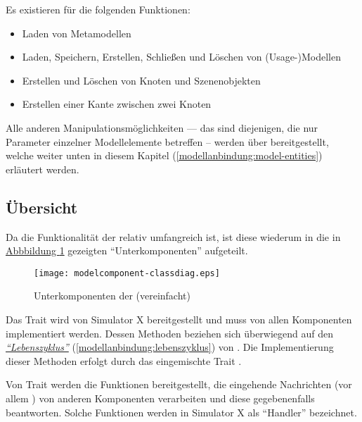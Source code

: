 \documentclass[a4paper,10pt]{sphinxmanual}
\begin{document}
Es existieren  für die folgenden Funktionen:
\begin{itemize}
\item {} 
Laden von Metamodellen

\item {} 
Laden, Speichern, Erstellen, Schließen und Löschen von (Usage-)Modellen

\item {} 
Erstellen und Löschen von Knoten und Szenenobjekten

\item {} 
Erstellen einer Kante zwischen zwei Knoten

\end{itemize}

Alle anderen Manipulationsmöglichkeiten — das sind diejenigen, die nur Parameter einzelner Modellelemente betreffen – werden über  bereitgestellt, welche weiter unten in diesem Kapitel {\hyperref[modellanbindung:model-entities]{\emph{}}} (\autoref*{modellanbindung:model-entities}) erläutert werden.


\subsection{Übersicht}
\label{modellanbindung:ubersicht}
Da die Funktionalität der  relativ umfangreich ist, ist diese wiederum in die in  \hyperref[modellanbindung:modelcomponent-classdiag]{Abbbildung  \ref*{modellanbindung:modelcomponent-classdiag}} gezeigten "`Unterkomponenten"' aufgeteilt.
\begin{figure}[htbp]
\centering
\capstart

\texttt{[image: modelcomponent-classdiag.eps]}
\caption{Unterkomponenten der  (vereinfacht)}\label{modellanbindung:modelcomponent-classdiag}\end{figure}

Das Trait  wird von Simulator X bereitgestellt und muss von allen Komponenten implementiert werden.
Dessen Methoden beziehen sich überwiegend auf den {\hyperref[modellanbindung:lebenszyklus]{\emph{"`Lebenszyklus"'}}} (\autoref*{modellanbindung:lebenszyklus}) von .
Die Implementierung dieser Methoden erfolgt durch das eingemischte Trait .

Von Trait  werden die Funktionen bereitgestellt, die eingehende Nachrichten (vor allem ) von anderen Komponenten verarbeiten und diese gegebenenfalls beantworten.
Solche Funktionen werden in Simulator X als "`Handler"' bezeichnet.
\end{document}
